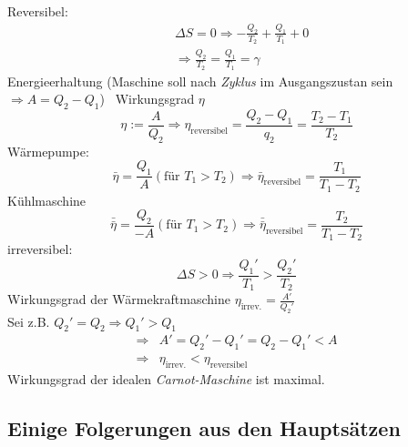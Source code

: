 \begin{enumerate}
Reversibel:
\begin{equation}
\begin{split}
  & \Delta S = 0 \Rightarrow - \frac{Q_2}{T_2} + \frac{Q_1}{T_1} + 0  \\
  & \Rightarrow \frac{Q_2}{T_2} = \frac{Q_1}{T_1} = \gamma
\end{split}
\end{equation}
Energieerhaltung (Maschine soll nach \emph{Zyklus} im Ausgangszustan sein $\Rightarrow A = Q_2 - Q_1$) \
Wirkungsgrad $\eta$
\begin{equation}
  \eta := \frac{A}{Q_2} \Rightarrow \eta_{\text{reversibel}} = \frac{Q_2 - Q_1}{q_2} = \frac{T_2 - T_1}{T_2}
\end{equation}
Wärmepumpe:
\begin{equation}
\bar{\eta} = \frac{Q_1}{A} (\text{für } T_1 > T_2) \Rightarrow \bar{\eta}_{\text{reversibel}} = \frac{T_1}{T_1 - T_2}
\end{equation}
Kühlmaschine
\begin{equation}
\bar{\bar{\eta}} = \frac{Q_2}{-A} (\text{für } T_1 > T_2) \Rightarrow \bar{\bar{\eta}}_{\text{reversibel}} = \frac{T_2}{T_1-T_2}
\end{equation}
irreversibel:
\begin{equation}
  \Delta S > 0 \Rightarrow \frac{Q_1'}{T_1} > \frac{Q_2'}{T_2}
\end{equation}
Wirkungsgrad der Wärmekraftmaschine $\eta_{\text{irrev.}} = \frac{A'}{Q_2'}$ \\
Sei z.B. $Q_2' = Q_2 \Rightarrow Q_1' > Q_1$
\begin{equation}
\begin{split}
  \Rightarrow & A' = Q_2' - Q_1' = Q_2 - Q_1' < A \\
  \Rightarrow & \eta_\text{irrev.} < \eta_\text{reversibel}
\end{split}
\end{equation}
Wirkungsgrad der idealen \emph{Carnot-Maschine} ist maximal.
\end{enumerate}

\subsection{Einige Folgerungen aus den Hauptsätzen}
